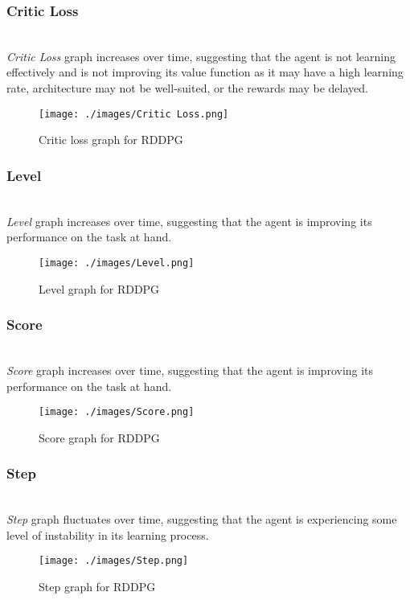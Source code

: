 \documentclass[preprint,12pt]{elsarticle}
\begin{document}
\subsubsection{Critic Loss}\\
\textit{Critic Loss} graph increases over time, suggesting that the agent is not learning effectively and is not improving its value function as it may have a high learning rate, architecture may not be well-suited, or the rewards may be delayed.
\begin{figure}[!htbp]
    \centering
    \texttt{[image: ./images/Critic Loss.png]}
    \caption{Critic loss graph for RDDPG}
\end{figure}

\subsubsection{Level}\\
\textit{Level} graph increases over time, suggesting that the agent is improving its performance on the task at hand.
\begin{figure}[!htbp]
    \centering
    \texttt{[image: ./images/Level.png]}
    \caption{Level graph for RDDPG}
\end{figure}

\subsubsection{Score}\\
\textit{Score} graph increases over time, suggesting that the agent is improving its performance on the task at hand.
\begin{figure}[!htbp]
    \centering
    \texttt{[image: ./images/Score.png]}
    \caption{Score graph for RDDPG}
\end{figure}

\subsubsection{Step}\\
\textit{Step} graph fluctuates over time, suggesting that the agent is experiencing some level of instability in its learning process.
\begin{figure}[!htbp]
    \centering
    \texttt{[image: ./images/Step.png]}
    \caption{Step graph for RDDPG}
\end{figure}
\end{document}
